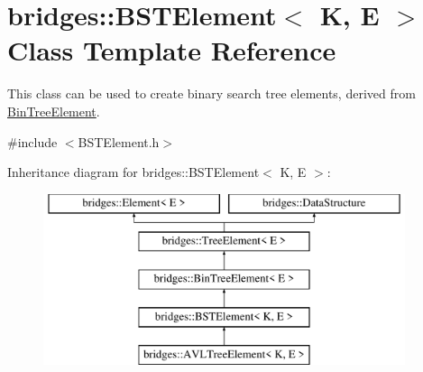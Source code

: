 \hypertarget{classbridges_1_1_b_s_t_element}{}\section{bridges\+:\+:B\+S\+T\+Element$<$ K, E $>$ Class Template Reference}
\label{classbridges_1_1_b_s_t_element}


This class can be used to create binary search tree elements, derived from \mbox{\hyperlink{classbridges_1_1_bin_tree_element}{Bin\+Tree\+Element}}.  




{\ttfamily \#include $<$B\+S\+T\+Element.\+h$>$}

Inheritance diagram for bridges\+:\+:B\+S\+T\+Element$<$ K, E $>$\+:\begin{figure}[H]
\begin{center}
\leavevmode
\includegraphics[height=5.000000cm]{classbridges_1_1_b_s_t_element}
\end{center}
\end{figure}
